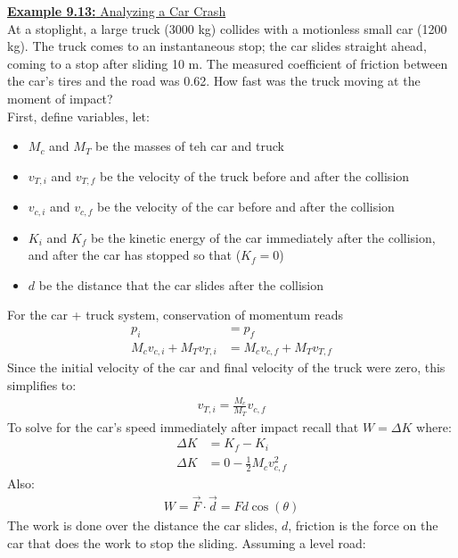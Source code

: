 \documentclass[a4paper]{article}
\let\bf\textbf
\begin{document}
\newpage
\begin{shaded}
    \underline{\bf{Example 9.13:} Analyzing a Car Crash}
    \vspace{2mm}\\
    At a stoplight, a large truck (3000 kg) collides with a motionless small car (1200 kg). The truck comes to an instantaneous stop; the car slides straight ahead, coming to a stop after sliding 10 m. The measured coefficient of friction between the car's tires and the road was 0.62. How fast was the truck moving at the moment of impact?
    \vspace{1mm}\\
    First, define variables, let:
    \begin{itemize}
        \item $M_c$ and $M_T$ be the masses of teh car and truck
        \item $v_{T,i}$ and $v_{T,f}$ be the velocity of the truck before and after the collision
        \item $v_{c,i}$ and $v_{c,f}$ be the velocity of the car before and after the collision
        \item $K_i$ and $K_f$ be the kinetic energy of the car immediately after the collision, and after the car has stopped so that ($K_f = 0$)
        \item $d$ be the distance that the car slides after the collision
    \end{itemize}
    For the car + truck system, conservation of momentum reads
    \begin{align*}
        p_i &= p_f\\
        M_c v_{c,i} + M_T v_{T,i} &= M_c v_{c,f} + M_T v_{T,f}
    \end{align*}
    Since the initial velocity of the car and final velocity of the truck were zero, this simplifies to:
    \begin{align*}
        v_{T,i} = \frac{M_c}{M_T}v_{c,f}
    \end{align*}
    To solve for the car's speed immediately after impact recall that $\displaystyle W = \Delta K$ where:
    \begin{align*}
        \Delta K &= K_f - K_i\\
        \Delta K &= 0 - \frac{1}{2}M_c v^2_{c,f}
    \end{align*}
    Also: 
    \begin{align*}
        W = \vec{F} \cdot \vec{d} = Fd\cos(\theta)
    \end{align*}
    The work is done over the distance the car slides, $d$, friction is the force on the car that does the work to stop the sliding. Assuming a level road:

\end{shaded}
\end{document}
